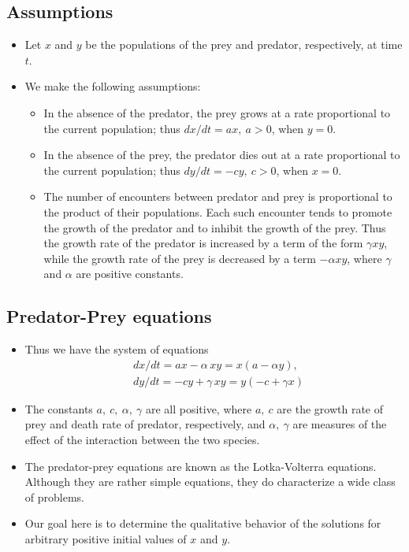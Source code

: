 \documentclass[11pt,a4paper]{article}
\begin{document}
	\subsection*{Assumptions}
	\begin{itemize}
		\item Let $x$ and $y$ be the populations of the prey and predator, respectively, at time $t$.
		\item We make the following assumptions:
		\begin{itemize}
			\item[\labelitemi] In the absence of the predator, the prey grows at a rate proportional to the current population; thus $dx/dt = ax,\ a > 0$, when $y = 0$.
			\item[\labelitemi] In the absence of the prey, the predator dies out at a rate proportional to the current population; thus $dy/dt = -cy,\ c > 0$, when $x = 0$.
			\item[\labelitemi] The number of encounters between predator and prey is proportional to the product of their populations. Each such encounter tends to promote the growth of the predator and to inhibit the growth of the prey. Thus the growth rate of the predator is increased by a term of the form $\gamma xy$, while the growth rate of the prey is decreased by a term $-\alpha xy$, where $\gamma$ and $\alpha$ are positive constants.
		\end{itemize}
	\end{itemize}
	\subsection*{Predator-Prey equations}
	\begin{itemize}
		\item Thus we have the system of equations
		\begin{align*}
			& dx/dt = ax - \alpha\, xy = x(a-\alpha y),\\
			& dy/dt = -cy + \gamma\, xy = y(-c+\gamma x)
		\end{align*}
		\item The constants $a,\ c,\ \alpha,\ \gamma$ are all positive, where $a,\ c$ are the growth rate of prey and death rate of predator, respectively, and $\alpha,\ \gamma$ are measures of the effect of the interaction between the two species.
		\item The predator-prey equations are known as the Lotka-Volterra equations. Although they are rather simple equations, they do characterize a wide class of problems.
		\item Our goal here is to determine the qualitative behavior of the solutions for arbitrary positive initial values of $x$ and $y$.
	\end{itemize}
\end{document}
